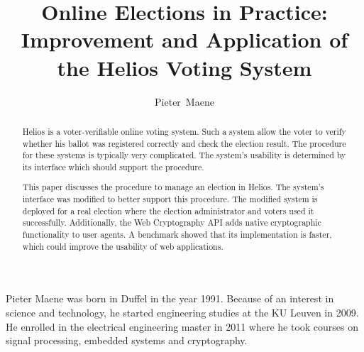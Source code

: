 \documentclass[a4paper,journal]{IEEEtran}
\begin{document}
  
  

  \title{Online Elections in Practice: Improvement and Application of the Helios Voting System}
  \author{Pieter~Maene}

  \maketitle
  
  \begin{abstract}    
    Helios is a voter-verifiable online voting system. Such a system allow the voter to verify whether his ballot was registered correctly and check the election result. The procedure for these systems is typically very complicated. The system's usability is determined by its interface which should support the procedure.
    
    \par This paper discusses the procedure to manage an election in Helios. The system's interface was modified to better support this procedure. The modified system is deployed for a real election where the election administrator and voters used it successfully. Additionally, the Web Cryptography API adds native cryptographic functionality to user agents. A benchmark showed that its implementation is faster, which could improve the usability of web applications.
  \end{abstract}
  
  
  
  
  
  
  
  
  
  

  \begin{IEEEbiography}{Pieter Maene} was born in Duffel in the year 1991. Because of an interest in science and technology, he started engineering studies at the KU Leuven in 2009. He enrolled in the electrical engineering master in 2011 where he took courses on signal processing, embedded systems and cryptography.
  \end{IEEEbiography}
\end{document}
